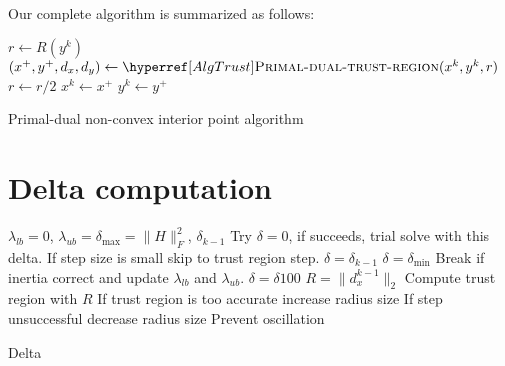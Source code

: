 \documentclass{article}
\begin{document}
Our complete algorithm is summarized as follows:

\begin{algorithm}[H]
\begin{algorithmic}\label{AlgMain}
\State $r \gets R (y^k)$
\Repeat
\State $(x^{+}, y^{+}, d_{x}, d_{y}) \gets \callAlgTrust{x^k, y^k, r}$
\State {}
\EndIf
\EndIf
\State $r \gets r / 2$
\State $x^{k} \gets x^{+}$
\State $y^k \gets y^{+}$
\EndFor
\EndFunction
\end{algorithmic}
\caption{Primal-dual non-convex interior point algorithm}
\end{algorithm}


\section{Delta computation}

\begin{algorithm}[H]
\begin{algorithmic}
\State $\lambda_{lb} = 0$, $\lambda_{ub} = \delta_{\max} = \| H \|^2_{F}$, $\delta_{k-1}$ 
\State Try $\delta = 0$, if succeeds, trial solve with this delta. If step size is small skip to trust region step.
\State $\delta = \delta_{k-1}$
\State $\delta = \delta_{\min}$
\EndIf
{}
\State Break if inertia correct and update $\lambda_{lb}$ and $\lambda_{ub}$.
\State $\delta = \delta 100$
\EndFor
\State {}
\State $R = \| d_{x}^{k-1} \|_{2}$
\State Compute trust region with $R$
\State If trust region is too accurate increase radius size
\State If step unsuccessful decrease radius size
\State Prevent oscillation
\EndFor
\end{algorithmic}
\caption{Delta}
\end{algorithm}
\end{document}
